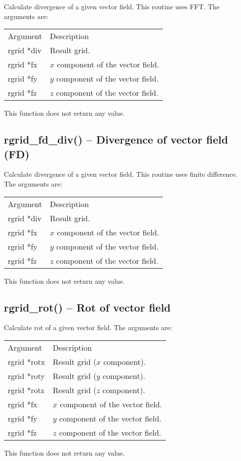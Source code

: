 \documentclass[12pt,letterpaper]{report}
\begin{document}
Calculate divergence of a given vector field. This routine uses FFT. The arguments are:
\begin{longtable}{p{} p{}}
Argument & Description\\
\cline{1-2}
rgrid *div & Result grid.\\
rgrid *fx  & $x$ component of the vector field.\\
rgrid *fy  & $y$ component of the vector field.\\
rgrid *fz  & $z$ component of the vector field.\\
\end{longtable}
\noindent
This function does not return any value. 

\subsection{rgrid\_fd\_div() -- Divergence of vector field (FD)}

Calculate divergence of a given vector field. This routine uses finite difference. The arguments are:
\begin{longtable}{p{} p{}}
Argument & Description\\
\cline{1-2}
rgrid *div & Result grid.\\
rgrid *fx  & $x$ component of the vector field.\\
rgrid *fy  & $y$ component of the vector field.\\
rgrid *fz  & $z$ component of the vector field.\\
\end{longtable}
\noindent
This function does not return any value. 

\subsection{rgrid\_rot() -- Rot of vector field}

Calculate rot of a given vector field. The arguments are:
\begin{longtable}{p{} p{}}
Argument & Description\\
\cline{1-2}
rgrid *rotx & Result grid ($x$ component).\\
rgrid *roty & Result grid ($y$ component).\\
rgrid *rotz & Result grid ($z$ component).\\
rgrid *fx  & $x$ component of the vector field.\\
rgrid *fy  & $y$ component of the vector field.\\
rgrid *fz  & $z$ component of the vector field.\\
\end{longtable}
\noindent
This function does not return any value. 
\end{document}
